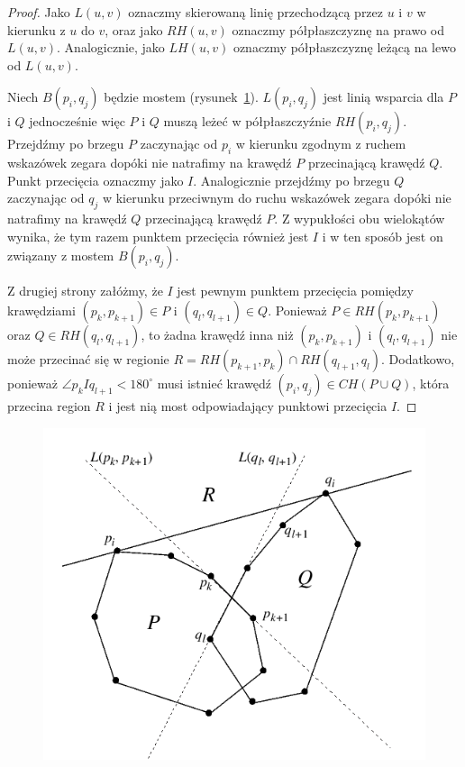 \begin{proof}
  Jako $L(u, v)$ oznaczmy skierowaną linię przechodzącą przez $u$ i
  $v$ w kierunku z $u$ do $v$, oraz jako $RH(u, v)$ oznaczmy
  półpłaszczyznę na prawo od $L(u, v)$. Analogicznie, jako $LH(u, v)$
  oznaczmy półpłaszczyznę leżącą na lewo od $L(u, v)$.

  Niech $B(p_i, q_j)$ będzie mostem
  (rysunek~\ref{img:toussaint2}). $L(p_i, q_j)$ jest linią wsparcia
  dla $P$ i $Q$ jednocześnie więc $P$ i $Q$ muszą leżeć w
  półpłaszczyźnie $RH(p_i, q_j)$. Przejdźmy po brzegu $P$ zaczynając
  od $p_i$ w kierunku zgodnym z ruchem wskazówek zegara dopóki nie
  natrafimy na krawędź $P$ przecinającą krawędź $Q$. Punkt przecięcia
  oznaczmy jako $I$. Analogicznie przejdźmy po brzegu $Q$ zaczynając
  od $q_j$ w kierunku przeciwnym do ruchu wskazówek zegara dopóki nie
  natrafimy na krawędź $Q$ przecinającą krawędź $P$. Z wypukłości obu
  wielokątów wynika, że tym razem punktem przecięcia również jest $I$
  i w ten sposób jest on związany z mostem $B(p_i, q_j)$.

  Z drugiej strony załóżmy, że $I$ jest pewnym punktem przecięcia
  pomiędzy krawędziami $(p_k, p_{k+1}) \in P$ i $(q_l, q_{l+1}) \in
  Q$. Ponieważ $P \in RH(p_k, p_{k+1})$ oraz $Q \in RH(q_l, q_{l+1})$,
  to żadna krawędź inna niż $(p_k, p_{k+1})$ i $(q_l, q_{l+1})$ nie
  może przecinać się w regionie $R = RH(p_{k+1}, p_k) \cap RH(q_{l+1},
  q_l)$. Dodatkowo, ponieważ $\angle p_{k}Iq_{l+1} < 180^{\circ}$ musi
  istnieć krawędź $(p_i, q_j) \in CH(P \cup Q)$, która przecina region
  $R$ i jest nią most odpowiadający punktowi przecięcia $I$.
\end{proof}

\begin{figure}[htb]
  \centering
  \includegraphics[scale=0.7]{img/toussaint2}
  \caption{\label{img:toussaint2}}
\end{figure}

